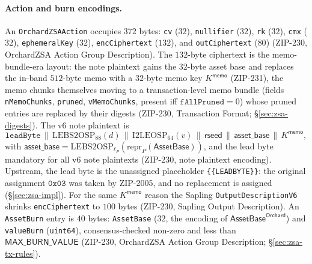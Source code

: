 \documentclass[11pt,a4paper]{article}
\theoremstyle{definition}
\begin{document}
\paragraph{Action and burn encodings.} An \texttt{OrchardZSAAction} occupies
$372$ bytes: \texttt{cv} ($32$), \texttt{nullifier} ($32$), \texttt{rk}
($32$), \texttt{cmx} ($32$), \texttt{ephemeralKey} ($32$),
\texttt{encCiphertext} ($132$), and \texttt{outCiphertext} ($80$) (ZIP-230,
OrchardZSA Action Group Description). The $132$-byte ciphertext is the
memo-bundle-era layout: the note plaintext gains the $32$-byte asset base and
replaces the in-band $512$-byte memo with a $32$-byte memo key
$K^{\mathsf{memo}}$ (ZIP-231), the memo chunks themselves moving to a
transaction-level memo bundle (fields \texttt{nMemoChunks},
\texttt{pruned}, \texttt{vMemoChunks}, present iff $\texttt{fAllPruned} =
0$) whose pruned entries are replaced by their digests (ZIP-230,
Transaction Format; \S\ref{sec:zsa-digests}). The v6 note
plaintext is
\[
\mathtt{leadByte} \,\|\, \mathrm{LEBS2OSP}_{88}(d) \,\|\,
\mathrm{I2LEOSP}_{64}(v) \,\|\, \mathsf{rseed} \,\|\,
\mathsf{asset\_base} \,\|\, K^{\mathsf{memo}},
\]
with $\mathsf{asset\_base} = \mathrm{LEBS2OSP}_{\ell_P}(\mathrm{repr}_P
(\mathsf{AssetBase}))$, and the lead byte mandatory for all v6 note
plaintexts (ZIP-230, note plaintext encoding). Upstream, the lead byte is the
unassigned placeholder \texttt{\{\{LEADBYTE\}\}}: the original assignment
$\mathtt{0x03}$ was taken by ZIP-2005, and no replacement is assigned
(\S\ref{sec:zsa-impl}). For the same $K^{\mathsf{memo}}$ reason the Sapling
\texttt{OutputDescriptionV6} shrinks \texttt{encCiphertext} to $100$ bytes
(ZIP-230, Sapling Output Description). An \texttt{AssetBurn} entry is $40$
bytes: \texttt{AssetBase} ($32$, the encoding of
$\mathsf{AssetBase}^{\mathsf{Orchard}}$) and \texttt{valueBurn}
(\texttt{uint64}), consensus-checked non-zero and less than
$\mathsf{MAX\_BURN\_VALUE}$ (ZIP-230, OrchardZSA Action Group Description;
\S\ref{sec:zsa-tx-rules}).
\end{document}
